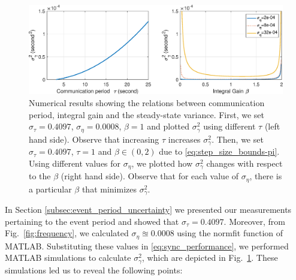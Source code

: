 \documentclass[journal,draftcls,onecolumn,12pt,twoside]{IEEEtranTCOM}
\begin{document}
\begin{figure}
\centering
\includegraphics[scale=0.35]{figures/alpha-period-vs-variance.eps}
\caption{\label{fig:simulations} Numerical results showing the relations between communication period, integral gain and the steady-state variance. First, we set $\sigma_{\tau}=0.4097$, $\sigma_\eta = 0.0008$, $\beta=1$ and plotted $\sigma^2_{\gamma}$ using different $\tau$ (left hand side). Observe that increasing $\tau$ increases $\sigma^2_{\gamma}$. Then, we set $\sigma_{\tau}=0.4097$,	$\tau=1$ and $\beta \in (0,2)$ due to \eqref{eq:step_size_bounds-pi}. Using different values for $\sigma_\eta$, we plotted how $\sigma^2_{\gamma}$ changes with respect to the $\beta$ (right hand side). Observe that for each value of $\sigma_\eta$, there is a particular $\beta$ that minimizes $\sigma^2_{\gamma}$.}
\end{figure}

In Section \ref{subsec:event_period_uncertainty} we presented our measurements pertaining to the event period and showed 
that $\sigma_{\tau}=0.4097$. Moreover, from Fig.~\ref{fig:frequency}, we calculated $\sigma_{\eta} \approxeq 0.0008$ using the \textsf{normfit} function of MATLAB.  Substituting these values in \eqref{eq:sync_performance}, we performed MATLAB simulations to calculate $\sigma^2_\gamma$, which are depicted in Fig.~\ref{fig:simulations}. These simulations led us to reveal the following points:
\end{document}
